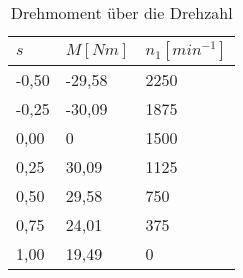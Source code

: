 \begin{table}[htbp]
    \centering
    \begin{tabularx}{\columnwidth}{XXX}
        \toprule
        $s$   & $M[Nm]$ & $n_1[min^{-1}]$ \\
        \midrule
        -0,50 & -29,58  & 2250            \\
        -0,25 & -30,09  & 1875            \\
        0,00  & 0       & 1500            \\
        0,25  & 30,09   & 1125            \\
        0,50  & 29,58   & 750             \\
        0,75  & 24,01   & 375             \\
        1,00  & 19,49   & 0               \\
        \bottomrule
    \end{tabularx}
    \caption{Drehmoment über die Drehzahl}
    \label{tab:sigma_vs_M_n1}
\end{table}
